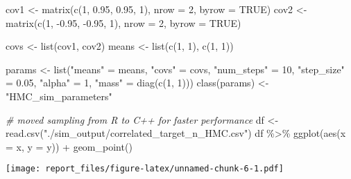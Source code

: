\documentclass[
]{article}
\newenvironment{Shaded}{\begin{snugshade}}{\end{snugshade}}
\newcommand{\AttributeTok}[1]{\textcolor[rgb]{0.77,0.63,0.00}{#1}}
\newcommand{\CommentTok}[1]{\textcolor[rgb]{0.56,0.35,0.01}{\textit{#1}}}
\newcommand{\ConstantTok}[1]{\textcolor[rgb]{0.00,0.00,0.00}{#1}}
\newcommand{\DecValTok}[1]{\textcolor[rgb]{0.00,0.00,0.81}{#1}}
\newcommand{\FloatTok}[1]{\textcolor[rgb]{0.00,0.00,0.81}{#1}}
\newcommand{\FunctionTok}[1]{\textcolor[rgb]{0.00,0.00,0.00}{#1}}
\newcommand{\NormalTok}[1]{#1}
\newcommand{\OtherTok}[1]{\textcolor[rgb]{0.56,0.35,0.01}{#1}}
\newcommand{\SpecialCharTok}[1]{\textcolor[rgb]{0.00,0.00,0.00}{#1}}
\newcommand{\StringTok}[1]{\textcolor[rgb]{0.31,0.60,0.02}{#1}}
\begin{document}
\begin{Shaded}
\begin{Highlighting}[]
\NormalTok{cov1 }\OtherTok{\textless{}{-}} \FunctionTok{matrix}\NormalTok{(}\FunctionTok{c}\NormalTok{(}\DecValTok{1}\NormalTok{, }\FloatTok{0.95}\NormalTok{, }\FloatTok{0.95}\NormalTok{, }\DecValTok{1}\NormalTok{), }\AttributeTok{nrow =} \DecValTok{2}\NormalTok{, }\AttributeTok{byrow =} \ConstantTok{TRUE}\NormalTok{)}
\NormalTok{cov2 }\OtherTok{\textless{}{-}} \FunctionTok{matrix}\NormalTok{(}\FunctionTok{c}\NormalTok{(}\DecValTok{1}\NormalTok{, }\SpecialCharTok{{-}}\FloatTok{0.95}\NormalTok{, }\SpecialCharTok{{-}}\FloatTok{0.95}\NormalTok{, }\DecValTok{1}\NormalTok{), }\AttributeTok{nrow =} \DecValTok{2}\NormalTok{, }\AttributeTok{byrow =} \ConstantTok{TRUE}\NormalTok{)}

\NormalTok{covs }\OtherTok{\textless{}{-}} \FunctionTok{list}\NormalTok{(cov1, cov2)}
\NormalTok{means }\OtherTok{\textless{}{-}} \FunctionTok{list}\NormalTok{(}\FunctionTok{c}\NormalTok{(}\DecValTok{1}\NormalTok{, }\DecValTok{1}\NormalTok{), }\FunctionTok{c}\NormalTok{(}\DecValTok{1}\NormalTok{, }\DecValTok{1}\NormalTok{))}

\NormalTok{params }\OtherTok{\textless{}{-}} \FunctionTok{list}\NormalTok{(}\StringTok{"means"} \OtherTok{=}\NormalTok{ means, }\StringTok{"covs"} \OtherTok{=}\NormalTok{ covs,}
               \StringTok{"num\_steps"} \OtherTok{=} \DecValTok{10}\NormalTok{,}
               \StringTok{"step\_size"} \OtherTok{=} \FloatTok{0.05}\NormalTok{,}
               \StringTok{"alpha"} \OtherTok{=} \DecValTok{1}\NormalTok{,}
               \StringTok{"mass"} \OtherTok{=} \FunctionTok{diag}\NormalTok{(}\FunctionTok{c}\NormalTok{(}\DecValTok{1}\NormalTok{, }\DecValTok{1}\NormalTok{)))}
\FunctionTok{class}\NormalTok{(params) }\OtherTok{\textless{}{-}} \StringTok{"HMC\_sim\_parameters"}

\CommentTok{\# moved sampling from R to C++ for faster performance}
\NormalTok{df }\OtherTok{\textless{}{-}} \FunctionTok{read.csv}\NormalTok{(}\StringTok{"./sim\_output/correlated\_target\_n\_HMC.csv"}\NormalTok{)}
\NormalTok{df }\SpecialCharTok{\%\textgreater{}\%}
    \FunctionTok{ggplot}\NormalTok{(}\FunctionTok{aes}\NormalTok{(}\AttributeTok{x =}\NormalTok{ x, }\AttributeTok{y =}\NormalTok{ y)) }\SpecialCharTok{+} \FunctionTok{geom\_point}\NormalTok{()}
\end{Highlighting}
\end{Shaded}

\texttt{[image: report\_files/figure-latex/unnamed-chunk-6-1.pdf]}
\end{document}
